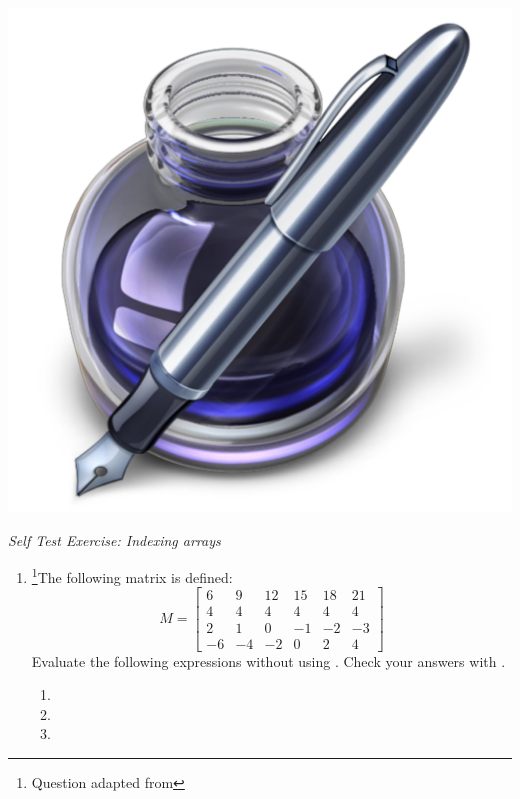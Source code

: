 \addtolength{\parindent}{-4mm}
\begin{minipage}{\linewidth}
\begin{minipage}{6mm}
\includegraphics[scale=0.035]{Graphics/General/exercise_icon}
\end{minipage}
\textit{Self Test Exercise: Indexing arrays}
\end{minipage}
\addtolength{\parindent}{4mm}
\begin{enumerate}
\item \footnote[2]{Question adapted from \gilatbook}The following matrix is defined:
\begin{equation*}
M=\left[ \begin{array}{rrrrrrr} 6 & 9 & 12 & 15 & 18 & 21 \\ 4 & 4 & 4 & 4 & 4 & 4 \\ 2 & 1 & 0 & -1 & -2 & -3 \\ -6 & -4 & -2 & 0 & 2 & 4 \end{array} \right]
\end{equation*}
Evaluate the following expressions without using \mlab. Check your answers with \mlab.
\begin{enumerate}
\item {}
\item {}
\item {}
\end{enumerate}
\end{enumerate}

